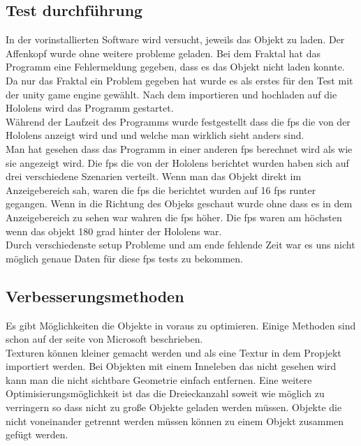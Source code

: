 \subsection{Test durchführung}\label{subsec:Test durchführung}
    In der vorinstallierten Software wird versucht, jeweils das Objekt zu laden.
    Der Affenkopf wurde ohne weitere probleme geladen.
    Bei dem Fraktal hat das Programm eine Fehlermeldung gegeben, dass es das Objekt nicht laden konnte.\\
    Da nur das Fraktal ein Problem gegeben hat wurde es als erstes für den Test mit der unity game engine \autocite{unity} gewählt.
    Nach dem importieren und hochladen auf die Hololens wird das Programm gestartet.\\
    Während der Laufzeit des Programms wurde festgestellt dass die fps die von der Hololens anzeigt wird und und welche man wirklich sieht anders sind.\\
    Man hat gesehen dass das Programm in einer anderen fps berechnet wird als wie sie angezeigt wird.
    Die fps die von der Hololens berichtet wurden haben sich auf drei verschiedene Szenarien verteilt.
    Wenn man das Objekt direkt im Anzeigebereich sah, waren die fps die berichtet wurden auf 16 fps runter gegangen.
    Wenn in die Richtung des Objeks geschaut wurde ohne dass es in dem Anzeigebereich zu sehen war wahren die fps höher.
    Die fps waren am höchsten wenn das objekt 180 grad hinter der Hololens war.\\
    Durch verschiedenste setup Probleme und am ende fehlende Zeit war es uns nicht möglich genaue Daten für diese fps tests zu bekommen.

\subsection{Verbesserungsmethoden}\label{subsec:Verbesserungsmethoden}

    Es gibt Möglichkeiten die Objekte in voraus zu optimieren.
    Einige Methoden sind schon auf der seite von Microsoft \autocite{best_practices} beschrieben.\\
    Texturen können kleiner gemacht werden und als eine Textur in dem Propjekt importiert werden.
    Bei Objekten mit einem Inneleben das nicht gesehen wird kann man die nicht sichtbare Geometrie einfach entfernen.
    Eine weitere Optimisierungsmöglichkeit ist das die Dreieckanzahl soweit wie möglich zu verringern so dass nicht zu große Objekte geladen werden müssen.
    Objekte die nicht voneinander getrennt werden müssen können zu einem Objekt zusammen gefügt werden.

